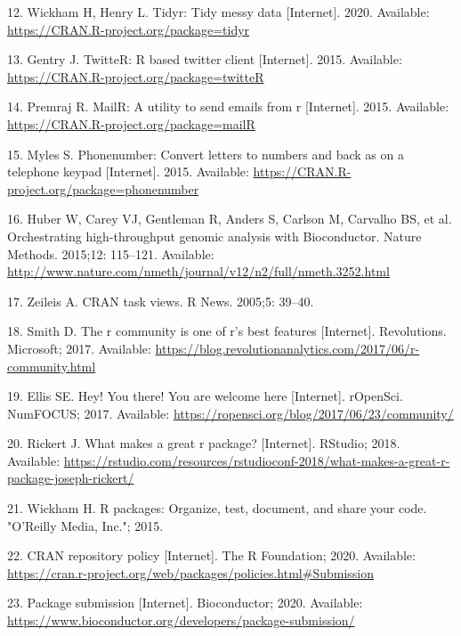 \documentclass[10pt,letterpaper]{article}
\begin{document}
\leavevmode\hypertarget{ref-tidyr}{}%
12. Wickham H, Henry L. Tidyr: Tidy messy data {[}Internet{]}. 2020.
Available: \url{https://CRAN.R-project.org/package=tidyr}

\leavevmode\hypertarget{ref-twitteR}{}%
13. Gentry J. TwitteR: R based twitter client {[}Internet{]}. 2015.
Available: \url{https://CRAN.R-project.org/package=twitteR}

\leavevmode\hypertarget{ref-mailR}{}%
14. Premraj R. MailR: A utility to send emails from r {[}Internet{]}.
2015. Available: \url{https://CRAN.R-project.org/package=mailR}

\leavevmode\hypertarget{ref-phonenumber}{}%
15. Myles S. Phonenumber: Convert letters to numbers and back as on a
telephone keypad {[}Internet{]}. 2015. Available:
\url{https://CRAN.R-project.org/package=phonenumber}

\leavevmode\hypertarget{ref-bioCproject}{}%
16. Huber W, Carey VJ, Gentleman R, Anders S, Carlson M, Carvalho BS, et
al. Orchestrating high-throughput genomic analysis with Bioconductor.
Nature Methods. 2015;12: 115--121. Available:
\url{http://www.nature.com/nmeth/journal/v12/n2/full/nmeth.3252.html}

\leavevmode\hypertarget{ref-zeileis2005}{}%
17. Zeileis A. CRAN task views. R News. 2005;5: 39--40.

\leavevmode\hypertarget{ref-smith2017}{}%
18. Smith D. The r community is one of r's best features {[}Internet{]}.
Revolutions. Microsoft; 2017. Available:
\url{https://blog.revolutionanalytics.com/2017/06/r-community.html}

\leavevmode\hypertarget{ref-ellis2017}{}%
19. Ellis SE. Hey! You there! You are welcome here {[}Internet{]}.
rOpenSci. NumFOCUS; 2017. Available:
\url{https://ropensci.org/blog/2017/06/23/community/}

\leavevmode\hypertarget{ref-rickert2018}{}%
20. Rickert J. What makes a great r package? {[}Internet{]}. RStudio;
2018. Available:
\url{https://rstudio.com/resources/rstudioconf-2018/what-makes-a-great-r-package-joseph-rickert/}

\leavevmode\hypertarget{ref-wickham2015}{}%
21. Wickham H. R packages: Organize, test, document, and share your
code. "O'Reilly Media, Inc."; 2015.

\leavevmode\hypertarget{ref-cranpolicy2020}{}%
22. CRAN repository policy {[}Internet{]}. The R Foundation; 2020.
Available:
\url{https://cran.r-project.org/web/packages/policies.html\#Submission}

\leavevmode\hypertarget{ref-biocpkgsub2020}{}%
23. Package submission {[}Internet{]}. Bioconductor; 2020. Available:
\url{https://www.bioconductor.org/developers/package-submission/}
\end{document}
